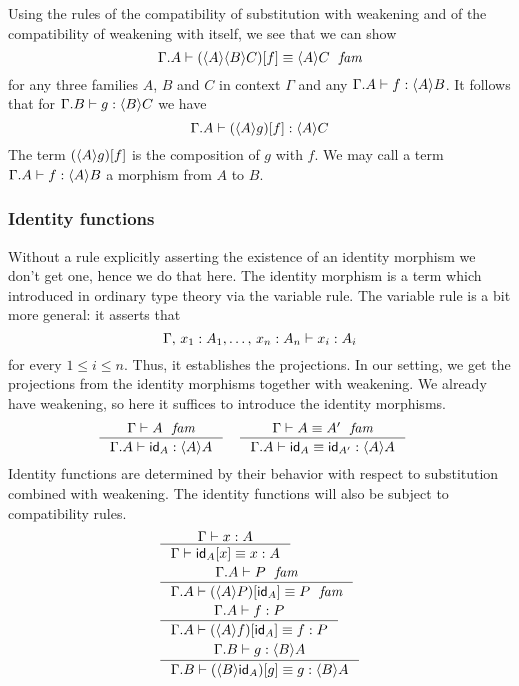 Using the rules of the compatibility of substitution with weakening and of the
compatibility of weakening with itself, we see that we can show
\begin{equation*}
\jfameq{\ctxext{\Gamma}{A}}{\subst{f}{\ctxwk{A}{{B}{C}}}}{\ctxwk{A}{C}}
\end{equation*}
for any three families $A$, $B$ and $C$ in context $\Gamma$ and any $\jterm{\ctxext{\Gamma}{A}}{\ctxwk{A}{B}}{f}$.
It follows that for $\jterm{\ctxext{\Gamma}{B}}{\ctxwk{B}{C}}{g}$ we have
\begin{equation*}
\jterm{\ctxext{\Gamma}{A}}{\ctxwk{A}{C}}{\subst{f}{\ctxwk{A}{g}}}
\end{equation*}
The term $\jcomp{A}{f}{g}$ is the composition of $g$ with $f$. We may call
a term $\jterm{\ctxext{\Gamma}{A}}{\ctxwk{A}{B}}{f}$ a morphism from $A$ to $B$.

\subsubsection{Identity functions}
Without a rule explicitly asserting the existence of an identity morphism we don't
get one, hence we do that here. The identity morphism is a term which introduced
in ordinary type theory via the variable rule. The variable rule is a bit more
general: it asserts that
\begin{equation*}
\jterm{\Gamma,\,x_1:A_1,\ldots,\,x_n:A_n}{A_i}{x_i}
\end{equation*}
for every $1\leq i\leq n$. Thus, it establishes the projections. In our setting,
we get the projections from the identity morphisms together with weakening. We
already have weakening, so here it suffices to introduce the identity morphisms.
\begin{align}
& \inference{\jfam{\Gamma}{A}}{\jterm{\ctxext{\Gamma}{A}}{\ctxwk{A}{A}}{\idfunc[A]}}
& & \inference{\jfameq{\Gamma}{A}{A'}}{\jtermeq{\ctxext{\Gamma}{A}}{\ctxwk{A}{A}}{\idfunc[A]}{\idfunc[A']}}
\end{align}
Identity functions are determined by their behavior with respect to substitution combined with
weakening. The identity functions will also be subject to compatibility rules.
\begin{align}
& \inference{\jterm{\Gamma}{A}{x}}{\jtermeq{\Gamma}{A}{\subst{x}{\idfunc[A]}}{x}}\label{idfunc-subst-defn}\\
& \inference{\jfam{\ctxext{\Gamma}{A}}{P}}{\jfameq{\ctxext{\Gamma}{A}}{\subst{\idfunc[A]}{\ctxwk{A}{P}}}{P}}\label{idfunc-wk-defn}\\
& \inference{\jterm{\ctxext{\Gamma}{A}}{P}{f}}{\jtermeq{\ctxext{\Gamma}{A}}{P}{\subst{\idfunc[A]}{\ctxwk{A}{f}}}{f}}\label{idfunc-precomp} \\
& \inference{\jterm{\ctxext{\Gamma}{B}}{\ctxwk{B}{A}}{g}}{\jtermeq{\ctxext{\Gamma}{B}}{\ctxwk{B}{A}}{\subst{g}{\ctxwk{B}{\idfunc[A]}}}{g}}\label{idfunc-postcomp}
\end{align}

